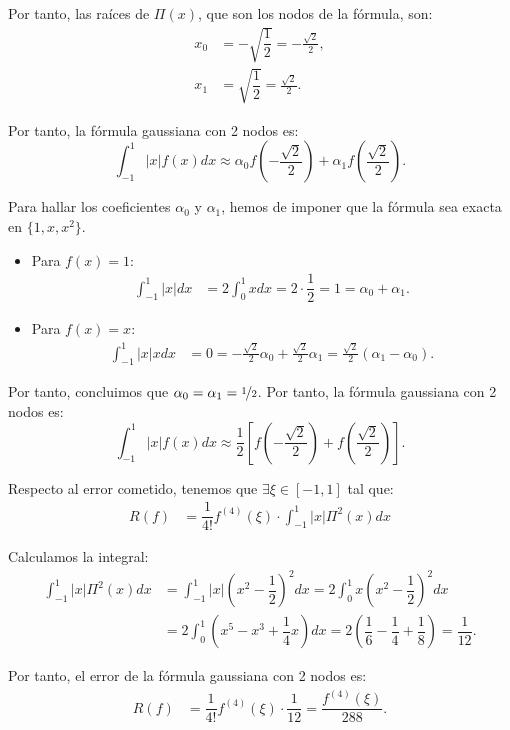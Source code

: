 \begin{ejercicio}
    Por tanto, las raíces de $\Pi(x)$, que son los nodos de la fórmula, son:
    \begin{align*}
        x_0 &= -\sqrt{\dfrac{1}{2}} = -\frac{\sqrt{2}}{2},\\
        x_1 &= \sqrt{\dfrac{1}{2}} = \frac{\sqrt{2}}{2}.
    \end{align*}

    Por tanto, la fórmula gaussiana con 2 nodos es:
    \begin{equation*}
        \int_{-1}^{1} |x|f(x) dx \approx \alpha_0 f\left(-\frac{\sqrt{2}}{2}\right) + \alpha_1 f\left(\frac{\sqrt{2}}{2}\right).
    \end{equation*}

    Para hallar los coeficientes $\alpha_0$ y $\alpha_1$, hemos de imponer que la fórmula sea exacta en $\{1,x,x^2\}$.
    \begin{itemize}
        \item Para $f(x) = 1$:
        \begin{align*}
            \int_{-1}^{1} |x| dx &= 2\int_{0}^{1} x dx = 2\cdot \dfrac{1}{2} = 1 = \alpha_0 + \alpha_1.
        \end{align*}
        \item Para $f(x) = x$:
        \begin{align*}
            \int_{-1}^{1} |x| x dx &= 0 = -\frac{\sqrt{2}}{2}\alpha_0 + \frac{\sqrt{2}}{2}\alpha_1
            = \frac{\sqrt{2}}{2}(\alpha_1 - \alpha_0).
        \end{align*}
    \end{itemize}

    Por tanto, concluimos que $\alpha_0 = \alpha_1 = \nicefrac{1}{2}$. Por tanto, la fórmula gaussiana con 2 nodos es:
    \begin{equation*}
        \int_{-1}^{1} |x|f(x) dx \approx \frac{1}{2}\left[f\left(-\frac{\sqrt{2}}{2}\right) + f\left(\frac{\sqrt{2}}{2}\right)\right].
    \end{equation*}

    Respecto al error cometido, tenemos que $\exists \xi \in [-1, 1]$ tal que:
    \begin{align*}
        R(f) &= \dfrac{1}{4!}f^{(4)}(\xi) \cdot \int_{-1}^{1} |x| \Pi^2(x) dx
    \end{align*}

    Calculamos la integral:
    \begin{align*}
        \int_{-1}^{1} |x| \Pi^2(x) dx &= \int_{-1}^{1} |x|\left(x^2 - \dfrac{1}{2}\right)^2 dx = 2\int_{0}^{1} x\left(x^2 - \dfrac{1}{2}\right)^2 dx\\
        &= 2\int_{0}^{1} \left(x^5 - x^3 + \dfrac{1}{4}x\right) dx = 2\left(\dfrac{1}{6} - \dfrac{1}{4} + \dfrac{1}{8}\right) = \dfrac{1}{12}.
    \end{align*}

    Por tanto, el error de la fórmula gaussiana con 2 nodos es:
    \begin{align*}
        R(f) &= \dfrac{1}{4!}f^{(4)}(\xi) \cdot \dfrac{1}{12} = \dfrac{f^{(4)}(\xi)}{288}.
    \end{align*}
\end{ejercicio}

